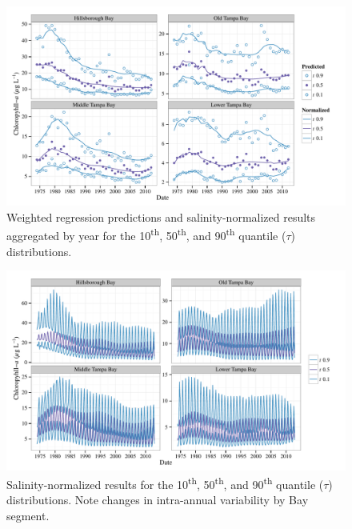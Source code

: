 \documentclass{svjour3}\usepackage[]{graphicx}\usepackage[]{color}
\begin{document}
\begin{figure}[!ht]


{\centering \includegraphics[width=6in]{figssalnrm} 

}

\caption[Weighted regression predictions and salinity-normalized results aggregated by year for  the 10\textsuperscript{th}, 50\textsuperscript{th}, and 90\textsuperscript{th} quantile ($\tau$) distributions]{Weighted regression predictions and salinity-normalized results aggregated by year for  the 10\textsuperscript{th}, 50\textsuperscript{th}, and 90\textsuperscript{th} quantile ($\tau$) distributions.\label{fig:salnrm}}
\end{figure}



\begin{figure}[!ht]


{\centering \includegraphics[width=6in]{figssalnrm2} 

}

\caption[Salinity-normalized results for the 10\textsuperscript{th}, 50\textsuperscript{th}, and 90\textsuperscript{th} quantile ($\tau$) distributions]{Salinity-normalized results for the 10\textsuperscript{th}, 50\textsuperscript{th}, and 90\textsuperscript{th} quantile ($\tau$) distributions. Note changes in intra-annual variability by Bay segment.\label{fig:salnrm2}}
\end{figure}
\end{document}
